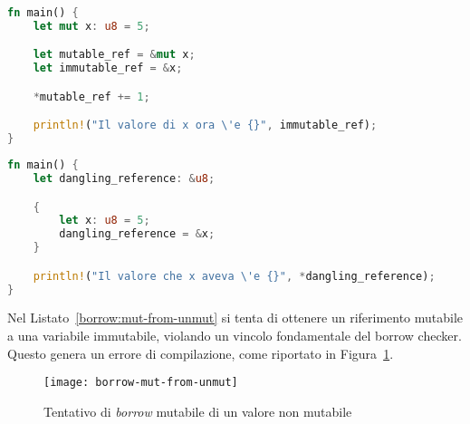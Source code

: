 \begin{lstlisting}[language=Rust, caption={Coesistenza reference mutabile e immutabile}, label={borrow:mut-and-unmut}]
fn main() {
    let mut x: u8 = 5;

    let mutable_ref = &mut x;
    let immutable_ref = &x;

    *mutable_ref += 1;

    println!("Il valore di x ora \'e {}", immutable_ref);
}
\end{lstlisting}

\begin{lstlisting}[language=Rust, caption={Reference non valida: \textit{dangling reference}}, label={borrow:dangling-reference}]
fn main() {
    let dangling_reference: &u8;

    {
        let x: u8 = 5;
        dangling_reference = &x;
    }

    println!("Il valore che x aveva \'e {}", *dangling_reference);
}
\end{lstlisting}
Nel Listato~\ref{borrow:mut-from-unmut} si tenta di ottenere un riferimento mutabile a una variabile immutabile, violando un vincolo fondamentale del borrow checker. Questo genera un errore di compilazione, come riportato 
in Figura~\ref{borrow:mut-from-unmut-compile}.
\begin{figure}[htbp]
    \begin{center}
        \texttt{[image: borrow-mut-from-unmut]}
        \caption{Tentativo di \textit{borrow} mutabile di un valore non mutabile}\label{borrow:mut-from-unmut-compile}
    \end{center}
\end{figure}

